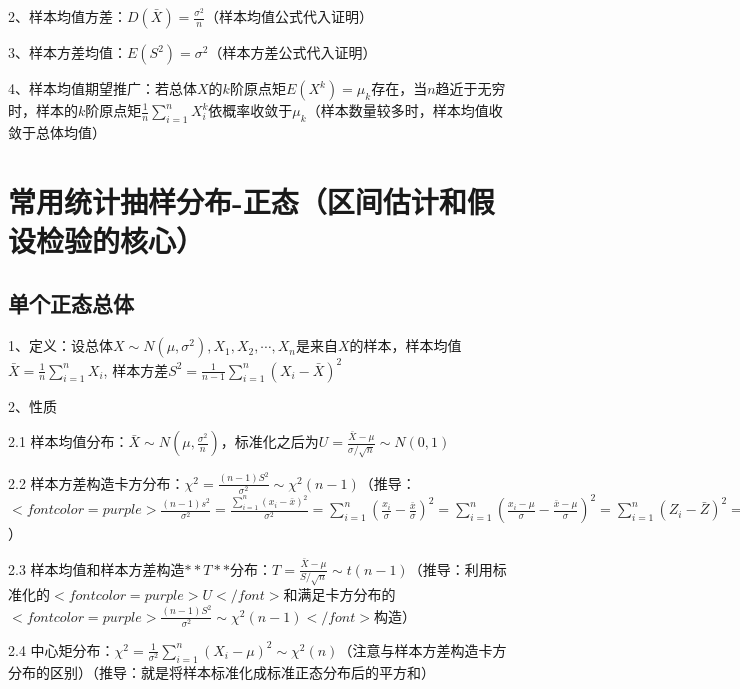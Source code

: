 2、样本均值方差：$ D(\bar{X}) = \frac{\sigma^2}{n} $（样本均值公式代入证明）

3、样本方差均值：$ E(S^2) = \sigma^2 $（样本方差公式代入证明）

4、样本均值期望推广：若总体$ X $的$ k $阶原点矩$ E(X^k)=\mu_k $存在，当$ n $趋近于无穷时，样本的$ k $阶原点矩$ \frac{1}{n}\sum_{i=1}^{n}X_i^k $依概率收敛于$ \mu_k $（样本数量较多时，样本均值收敛于总体均值）

\section{常用统计抽样分布-正态（区间估计和假设检验的核心）}



\subsection{单个正态总体}

1、定义：设总体$ X \sim N\left(\mu, \sigma^{2}\right), X_{1}, X_{2},\cdots, X_{n} $是来自$ X $的样本，样本均值$ \bar{X}=\frac{1}{n} \sum_{i=1}^{n} X_{i} $, 样本方差$ S^{2}=\frac{1}{n-1} \sum_{i=1}^{n}\left(X_{i}-\bar{X}\right)^{2} $

2、性质

2.1 样本均值分布：$ \bar{X} \sim N\left(\mu, \frac{\sigma^{2}}{n}\right) $，标准化之后为$ U=\frac{\bar{X}-\mu}{\sigma / \sqrt{n}} \sim N(0,1) $

2.2 样本方差构造卡方分布：$ \chi^{2}=\frac{(n-1) S^{2}}{\sigma^{2}} \sim \chi^{2}(n-1) $（推导：$ <font color=purple>\frac{(n-1) s^{2}}{\sigma^{2}} =\frac{\sum_{i=1}^{n}\left(x_{i}-\bar{x}\right)^{2}}{\sigma^{2}} =\sum_{i=1}^{n}\left(\frac{x_{i}}{\sigma}-\frac{\bar{x}}{\sigma}\right)^{2} =\sum_{i=1}^{n}\left(\frac{x_{i}-\mu}{\sigma}-\frac{\bar{x}-\mu}{\sigma}\right)^{2} =\sum_{i=1}^{n}\left(Z_{i}-\bar{Z}\right)^{2} =\sum_{i=1}^{n} Z_{i}^{2}-n \bar{Z}^{2}</font> $）

2.3 样本均值和样本方差构造$ **T** $分布：$ T=\frac{\bar{X}-\mu}{S / \sqrt{n}} \sim t(n-1) $（推导：利用标准化的$ <font color=purple>U</font> $和满足卡方分布的$ <font color=purple>\frac{(n-1) S^{2}}{\sigma^{2}} \sim \chi^{2}(n-1)</font> $构造）

2.4 中心矩分布：$ \chi^{2}=\frac{1}{\sigma^{2}} \sum_{i=1}^{n}\left(X_{i}-\mu\right)^{2} \sim \chi^{2}(n) $（注意与样本方差构造卡方分布的区别）（推导：就是将样本标准化成标准正态分布后的平方和）



